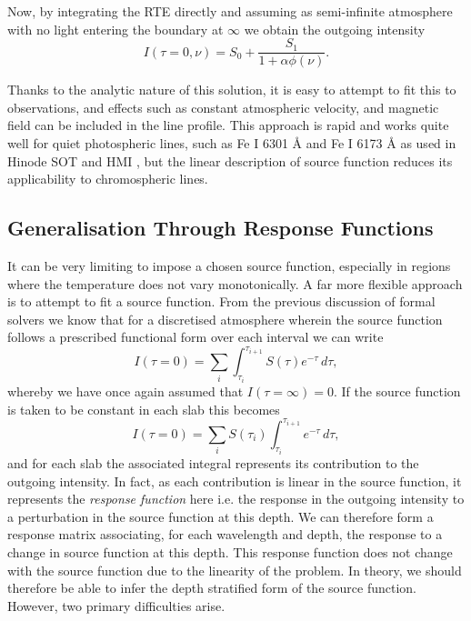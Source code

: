 Now, by integrating the RTE directly and assuming as semi-infinite atmosphere with no light entering the boundary at $\infty$ we obtain the outgoing intensity
\begin{equation}
I(\tau=0, \nu) = S_0 + \frac{S_1}{1 + \alpha\phi(\nu)}.
\end{equation}

Thanks to the analytic nature of this solution, it is easy to attempt to fit this to observations, and effects such as constant atmospheric velocity, and magnetic field can be included in the line profile.
This approach is rapid and works quite well for quiet photospheric lines, such as Fe I 6301 \AA{} and Fe I 6173 \AA{} as used in Hinode SOT and HMI \citep[e.g.][]{Centeno2014}, but the linear description of source function reduces its applicability to chromospheric lines.

\subsection{Generalisation Through Response Functions}


It can be very limiting to impose a chosen source function, especially in regions where the temperature does not vary monotonically.
A far more flexible approach is to attempt to fit a source function.
From the previous discussion of formal solvers we know that for a discretised atmosphere wherein the source function follows a prescribed functional form over each interval we can write
\begin{equation}
    I(\tau=0) = \sum_i \int_{\tau_i}^{\tau_{i+1}} S(\tau)e^{-\tau}\, d\tau,
\end{equation}
whereby we have once again assumed that $I(\tau=\infty)=0$.
If the source function is taken to be constant in each slab this becomes
\begin{equation}\label{Eq:LinearResponse}
    I(\tau=0) = \sum_i S(\tau_i) \int_{\tau_i}^{\tau_{i+1}} e^{-\tau}\, d\tau,
\end{equation}
and for each slab the associated integral represents its contribution to the outgoing intensity.
In fact, as each contribution is linear in the source function, it represents the \emph{response function} here i.e. the response in the outgoing intensity to a perturbation in the source function at this depth.
We can therefore form a response matrix associating, for each wavelength and depth, the response to a change in source function at this depth.
This response function does not change with the source function due to the linearity of the problem.
In theory, we should therefore be able to infer the depth stratified form of the source function.
However, two primary difficulties arise.

